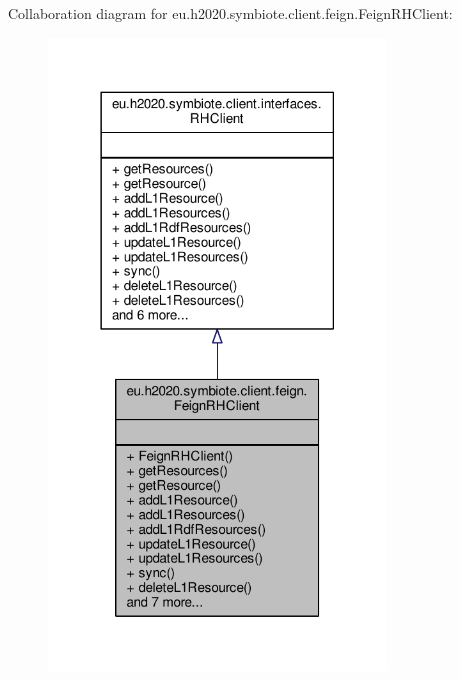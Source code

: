 Collaboration diagram for eu.\+h2020.\+symbiote.\+client.\+feign.\+Feign\+R\+H\+Client\+:
\nopagebreak
\begin{figure}[H]
\begin{center}
\leavevmode
\includegraphics[width=254pt]{classeu_1_1h2020_1_1symbiote_1_1client_1_1feign_1_1FeignRHClient__coll__graph}
\end{center}
\end{figure}
